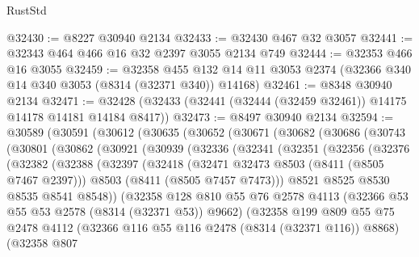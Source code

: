 \begin{lexlean}{RustStd}
\begin{coremodule}
@32430 := @8227 @30940 @2134
@32433 := @32430 @467 @32 @3057
@32441 := @32343 @464 @466 @16 @32 @2397 @3055 @2134 @749
@32444 := @32353 @466 @16 @3055
@32459 := @32358
    @455
    @132
    @14
    @11
    @3053
    @2374
    (@32366 @340 @14 @340 @3053 (@8314 (@32371 @340)) @14168)
@32461 := @8348 @30940 @2134
@32471 := @32428 (@32433 (@32441 (@32444 (@32459 @32461)) @14175 @14178 @14181 @14184 @8417))
@32473 := @8497 @30940 @2134
@32594 := @30589
    (@30591
      (@30612
        (@30635
          (@30652
            (@30671
              (@30682
                (@30686
                  (@30743
                    (@30801
                      (@30862
                        (@30921
                          (@30939
                            (@32336
                              (@32341
                                (@32351
                                  (@32356
                                    (@32376
                                      (@32382
                                        (@32388
                                          (@32397
                                            (@32418
                                              (@32471 @32473 @8503 (@8411 (@8505 @7467 @2397)))
                                              @8503
                                              (@8411 (@8505 @7457 @7473)))
                                            @8521
                                            @8525
                                            @8530
                                            @8535
                                            @8541
                                            @8548))
                                        (@32358
                                          @128
                                          @810
                                          @55
                                          @76
                                          @2578
                                          @4113
                                          (@32366 @53 @55 @53 @2578 (@8314 (@32371 @53)) @9662)
                                          (@32358
                                            @199
                                            @809
                                            @55
                                            @75
                                            @2478
                                            @4112
                                            (@32366 @116 @55 @116 @2478 (@8314 (@32371 @116)) @8868)
                                            (@32358
                                              @807

\end{coremodule}
\end{lexlean}
